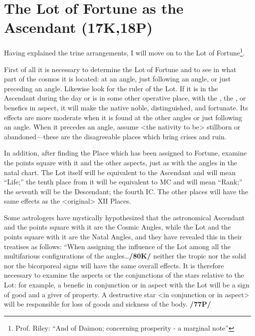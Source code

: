 \section{The Lot of Fortune as the Ascendant (17K,18P)}
Having explained the trine arrangements, I will move on to the Lot of Fortune\footnote{Prof. Riley: ``And of Daimon; concerning prosperity - a marginal note''}. 

First of all it is necessary to determine the Lot of Fortune and to see in what part of the cosmos it is located: at an angle, just following an angle, or just preceding an angle. Likewise look for the ruler of the Lot. If it is in the Ascendant during the day or is in some other operative place, with the \Sun, the \Moon, or benefics in aspect, it will make the native noble, distinguished, and fortunate. Its effects are more moderate when it is found at the other angles or just following an angle.  \mndl When it precedes an angle, assume <the nativity to be> stillborn or abandoned—these are the disagreeable places which bring crises and ruin.

In addition, after finding the Place which has been assigned to Fortune, examine the points square with it and the other aspects, just as with the angles in the natal chart. The Lot itself will be equivalent to the Ascendant and will mean “Life;” the tenth place from it will be equivalent to MC and will mean “Rank;” the seventh will be the Descendant; the fourth IC. The other places will have the same effects as the
<original> XII Places. 

Some astrologers have mystically hypothesized that the astronomical Ascendant and the points square with it are the Cosmic Angles, while the Lot and the points square with it are the Natal Angles, and they have revealed this in their treatises as follows: “When assigning the influence of the
Lot among all the multifarious configurations of the angles\ldots \textbf{/80K/} neither the tropic nor the solid nor the bicorporeal signs will have the same overall effects. It is therefore necessary to examine the aspects or the
conjunctions of the stars relative to the Lot: for example, a benefic in conjunction or in aspect with the Lot will be a sign of good and a giver of property. A destructive star <in conjunction or in aspect> will be responsible for loss of goods and sickness of the body. \textbf{/77P/}

\newpage